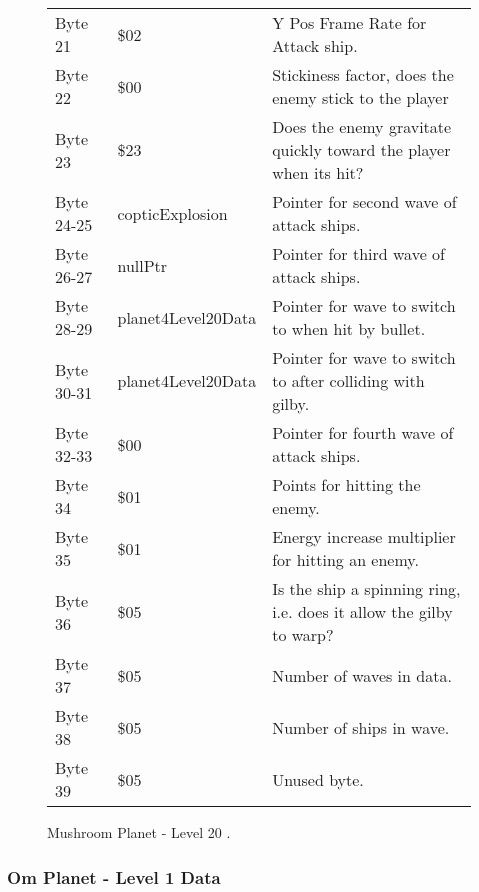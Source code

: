 \begin{figure}[H]
{\begin{adjustbox}{width=12cm}
\begin{tabular}{lll}
 Byte 21    & \$02                & Y Pos Frame Rate for Attack ship.                                   \\
 Byte 22    & \$00                & Stickiness factor, does the enemy stick to the player               \\
 Byte 23    & \$23                & Does the enemy gravitate quickly toward the player when its hit?    \\
 Byte 24-25 & copticExplosion    & Pointer for second wave of attack ships.                            \\
 Byte 26-27 & nullPtr            & Pointer for third wave of attack ships.                             \\
 Byte 28-29 & planet4Level20Data & Pointer for wave to switch to when hit by bullet.                   \\
 Byte 30-31 & planet4Level20Data & Pointer for  wave to switch to after colliding with gilby.          \\
 Byte 32-33 & \$00                & Pointer for fourth wave of attack ships.                            \\
 Byte 34    & \$01                & Points for hitting the enemy.                                       \\
 Byte 35    & \$01                & Energy increase multiplier for hitting an enemy.                    \\
 Byte 36    & \$05                & Is the ship a spinning ring, i.e. does it allow the gilby to warp?  \\
 Byte 37    & \$05                & Number of waves in data.                                            \\
 Byte 38    & \$05                & Number of ships in wave.                                            \\
 Byte 39    & \$05                & Unused byte.                                                        \\
\bottomrule
\end{tabular}

  \end{adjustbox}

  }\caption*{Mushroom Planet - Level 20
.}
\end{figure}

\clearpage
\subsubsection{Om Planet - Level 1 Data}

